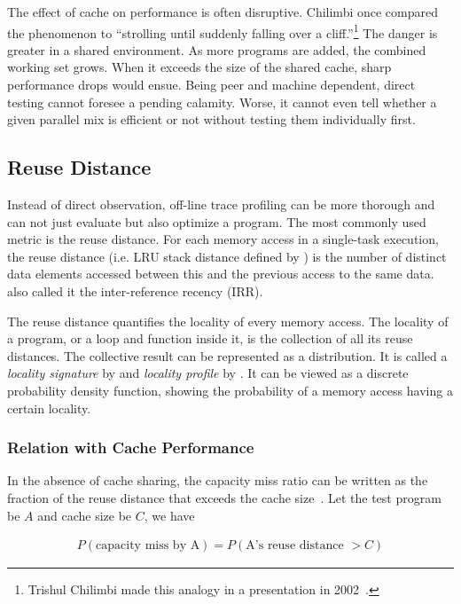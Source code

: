 The effect of cache on performance is often disruptive.  
Chilimbi once compared the phenomenon to ``strolling until suddenly falling over a
cliff.''\footnote{Trishul Chilimbi made this analogy in a
  presentation in 2002~\citep{ChilimbiH:PLDI02}.}  The danger is
greater in a shared environment.  As more programs are added, the
combined working set grows.  When it exceeds the size of the shared
cache, sharp performance drops would ensue.  Being peer and machine
dependent, direct testing cannot foresee a pending calamity.  Worse,
it cannot even tell whether a given parallel mix is efficient or not
without testing them individually first.

\subsection{Reuse Distance}
\label{sec:back:rd}

Instead of direct observation, off-line trace profiling can be more thorough and
can not just evaluate but also optimize a program.  %
The most commonly used
metric is the reuse distance.  For each memory access in a
single-task execution, the reuse distance (i.e. LRU stack
distance defined by \citet{Mattson+:IBM70}) is the number of distinct data
elements accessed between this and the previous access to the same
data.  \citep{JiangZ:SIGMetrics02} also called it the inter-reference recency
(IRR).  

The reuse distance quantifies the locality of every memory access.
The locality of a program, or a loop and function inside it, is the
collection of all its reuse distances.  The collective result can be
represented as a distribution.  It is called a \emph{locality
  signature} by \citep{Zhong+:TOPLAS09} and \emph{locality profile} by
\citep{Wu+:ISCA13}.  It can be viewed as a discrete probability
density function, showing the probability of a memory access having a
certain locality.

\subsubsection{Relation with Cache Performance}

In the absence of cache sharing, the capacity miss ratio can be
written as the fraction of the reuse distance that exceeds the cache
size~\citep{Mattson+:IBM70}.  Let the test program be $A$ and cache
size be $C$, we have

\begin{equation*}
\begin{array}{l}
  P(\mbox{capacity miss by A})  = P(\mbox{A's reuse distance $>C$})
\end{array}
\end{equation*}

